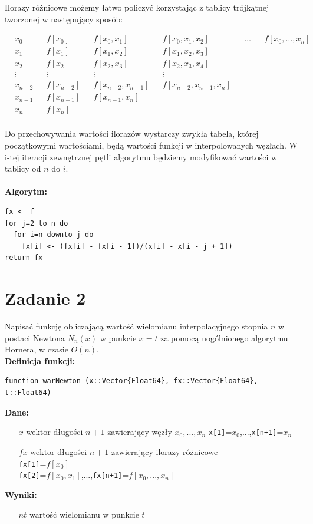 \documentclass[12pt]{article}
\begin{document}
\noindent Ilorazy różnicowe możemy łatwo policzyć korzystając z tablicy trójkątnej tworzonej w następujący sposób:
\begin{center}
  \begin{align*}
&  x_0    & &f[x_0]     & &f[x_0, x_1] 			& &f[x_0, x_1, x_2] & &\hdots & &f[x_0, \ldots, x_n]\\
&  x_1    & &f[x_1]     & &f[x_1, x_2] 			& &f[x_1, x_2, x_3]\\
&  x_2    & &f[x_2]     & &f[x_2, x_3] 			& &f[x_2, x_3, x_4]\\
& \vdots  & &\vdots     & &\vdots				& &\vdots\\
& x_{n-2} & &f[x_{n-2}] & &f[x_{n-2}, x_{n-1}]	& &f[x_{n-2}, x_{n-1}, x_n]\\
& x_{n-1} & &f[x_{n-1}] & &f[x_{n-1}, x_n] 		& &\\
& x_n     & &f[x_n]     & & \\
\end{align*}
\endminipage\hfill
\end{center}

\noindent Do przechowywania wartości ilorazów wystarczy zwykła tabela, której początkowymi wartościami, będą wartości funkcji w interpolowanych węzłach. W i-tej iteracji zewnętrznej pętli algorytmu będziemy modyfikować wartości w tablicy od $n$ do $i$.
\\
\\
\noindent \textbf{Algorytm:}
\begin{verbatim}
fx <- f
for j=2 to n do
  for i=n downto j do
    fx[i] <- (fx[i] - fx[i - 1])/(x[i] - x[i - j + 1])
return fx
\end{verbatim}

\section{Zadanie 2}
Napisać funkcję obliczającą wartość wielomianu interpolacyjnego stopnia $n$ w postaci Newtona $N_n(x)$ w punkcie $x=t$ za pomocą uogólnionego algorytmu Hornera, w czasie $O(n)$.\\
\textbf{Definicja funkcji:}

\begin{verbatim}
function warNewton (x::Vector{Float64}, fx::Vector{Float64}, t::Float64)
\end{verbatim}
\textbf{Dane:}
\begin{itemize}[leftmargin=4.0cm,labelsep=0.4cm]
\item[$x$] wektor długości $n + 1$ zawierający węzły $x_0, ..., x_n$ \texttt{x[1]}=$x_0$,...,\texttt{x[n+1]}=$x_n$
\item[$fx$] wektor długości $n+1$ zawierający ilorazy różnicowe \\
\texttt{fx[1]}=$f[x_0]$\\
\texttt{fx[2]}=$f[x_0, x_1]$,...,\texttt{fx[n+1]}=$f[x_0,...,x_n]$
\end{itemize}
\textbf{Wyniki:} 
\begin{itemize}[leftmargin=4.0cm,labelsep=0.4cm]
\item[$nt$] wartość wielomianu w punkcie $t$ \\
\end{itemize}
\end{document}
